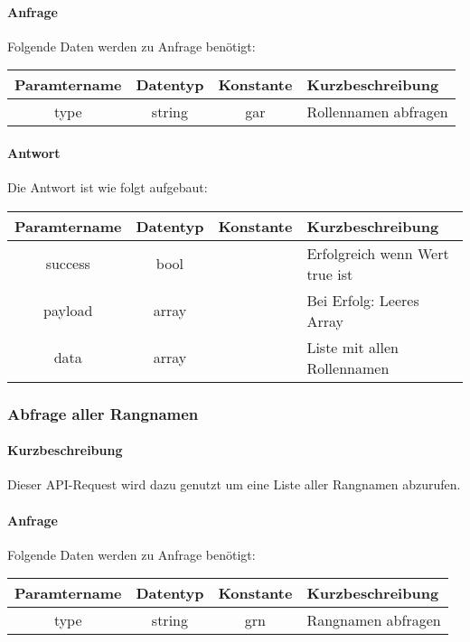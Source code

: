 \paragraph{Anfrage}Folgende Daten werden zu Anfrage benötigt:
\begin{table}[H]
	\begin{tabular}{|c|c|c|p{6.5cm}|}
		\hline
		\textbf{Paramtername} & \textbf{Datentyp} & \textbf{Konstante} & \textbf{Kurzbeschreibung}                                                                                               \\ \hline
		type                & string            & gar                & Rollennamen abfragen \\ \hline
	\end{tabular}
\end{table}
\paragraph{Antwort}Die Antwort ist wie folgt aufgebaut:
\begin{table}[H]
	\begin{tabular}{|c|c|c|p{6.5cm}|}
		\hline
		\textbf{Paramtername} & \textbf{Datentyp} & \textbf{Konstante} & \textbf{Kurzbeschreibung}            \\ \hline                
		success             & bool             &                 & Erfolgreich wenn Wert {\glqq true\grqq} ist \\ \hline
		payload             & array            &                 & Bei Erfolg: Leeres Array \\ \hline
		data                & array            &                 & Liste mit allen Rollennamen \\ \hline
	\end{tabular}
\end{table}
\subsubsection{Abfrage aller Rangnamen}
\paragraph{Kurzbeschreibung}Dieser API-Request wird dazu genutzt um eine Liste aller Rangnamen abzurufen.
\paragraph{Anfrage}Folgende Daten werden zu Anfrage benötigt:
\begin{table}[H]
	\begin{tabular}{|c|c|c|p{6.5cm}|}
		\hline
		\textbf{Paramtername} & \textbf{Datentyp} & \textbf{Konstante} & \textbf{Kurzbeschreibung}                                                                                               \\ \hline
		type                & string            & grn                & Rangnamen abfragen \\ \hline
	\end{tabular}
\end{table}

